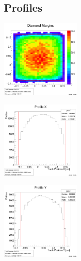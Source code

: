 \documentclass[9pt]{beamer}
\begin{document}
\subsection{Profiles}
\begin{frame}
	\begin{center}
		\includegraphics[width=4cm]{DiamondHitmap}
	\end{center}

	\begin{center}
		\begin{minipage}{4cm}
			\centering
			\includegraphics[width=4cm]{BeamProfileX}
		\end{minipage}
		\hspace*{2pt}
		\begin{minipage}{4cm}
			\centering
			\includegraphics[width=4cm]{BeamProfileY}
		\end{minipage}\no\s
	\end{center}
\end{frame}
\end{document}
